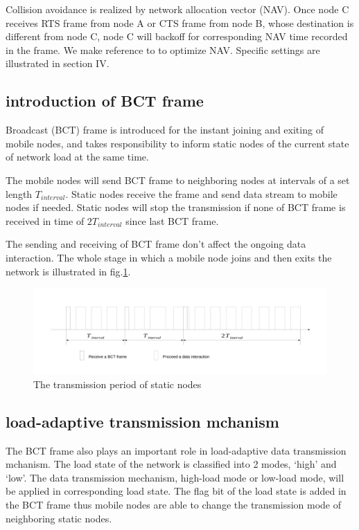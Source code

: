 \documentclass[conference]{IEEEtran}
\begin{document}
Collision avoidance is realized by network allocation vector (NAV). Once node C receives RTS frame from node A or CTS frame from node B, whose destination is different from node C, node C will backoff for corresponding NAV time recorded in the frame. We make reference to \cite{cho2016network} to optimize NAV. Specific settings are illustrated in section IV.

\subsection{introduction of BCT frame}
Broadcast (BCT) frame is introduced for the instant joining and exiting of mobile nodes, and takes responsibility to inform static nodes of the current state of network load at the same time.

The mobile nodes will send BCT frame to neighboring nodes at intervals of a set length $T_{interval}$. Static nodes receive the frame and send data stream to mobile nodes if needed. Static nodes will stop the transmission if none of BCT frame is received in time of $2T_{interval}$ since last BCT frame.

The sending and receiving of BCT frame don't affect the ongoing data interaction. The whole stage in which a mobile node joins and then exits the network is illustrated in fig.\ref{ml}.
\begin{figure}[ht]
	\centerline{\includegraphics[scale=0.15]{figures/3.pdf}}
	\caption{The transmission period of static nodes}
	\label{ml}
\end{figure}

\subsection{load-adaptive transmission mchanism}
The BCT frame also plays an important role in load-adaptive data transmission mchanism. The load state of the network is classified into 2 modes, `high' and `low'. The data transmission mechanism, high-load mode or low-load mode, will be applied in corresponding load state. The flag bit of the load state is added in the BCT frame thus mobile nodes are able to change the transmission mode of neighboring static nodes.
\end{document}
